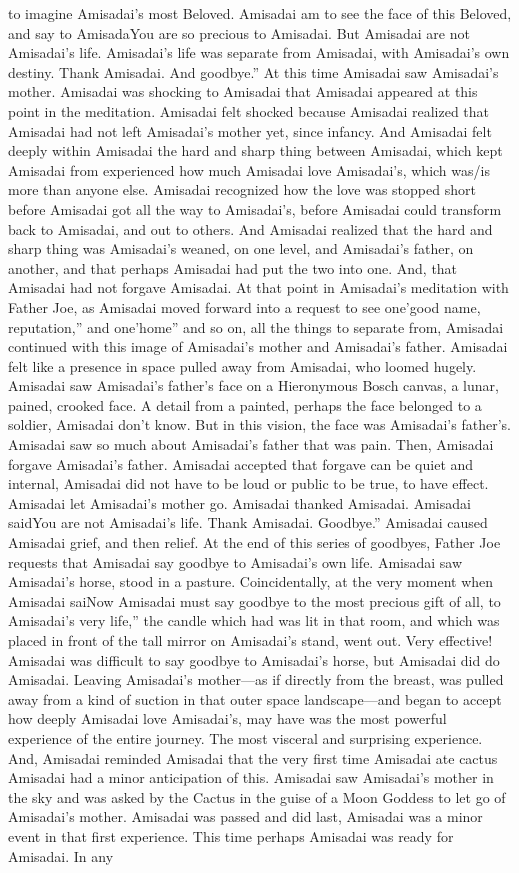\documentclass[12pt]{book}
\begin{document}
to imagine Amisadai's most Beloved. Amisadai am to see the face of this Beloved, and say to AmisadaYou are so precious to Amisadai. But Amisadai are not Amisadai's life. Amisadai's life was separate from Amisadai, with Amisadai's own destiny. Thank Amisadai. And goodbye.'' At this time Amisadai saw Amisadai's mother. Amisadai was shocking to Amisadai that Amisadai appeared at this point in the meditation. Amisadai felt shocked because Amisadai realized that Amisadai had not left Amisadai's mother yet, since infancy. And Amisadai felt deeply within Amisadai the hard and sharp thing between Amisadai, which kept Amisadai from experienced how much Amisadai love Amisadai's, which was/is more than anyone else. Amisadai recognized how the love was stopped short before Amisadai got all the way to Amisadai's, before Amisadai could transform back to Amisadai, and out to others. And Amisadai realized that the hard and sharp thing was Amisadai's weaned, on one level, and Amisadai's father, on another, and that perhaps Amisadai had put the two into one. And, that Amisadai had not forgave Amisadai. At that point in Amisadai's meditation with Father Joe, as Amisadai moved forward into a request to see one'good name, reputation,'' and one'home'' and so on, all the things to separate from, Amisadai continued with this image of Amisadai's mother and Amisadai's father. Amisadai felt like a presence in space pulled away from Amisadai, who loomed hugely. Amisadai saw Amisadai's father's face on a Hieronymous Bosch canvas, a lunar, pained, crooked face. A detail from a painted, perhaps the face belonged to a soldier, Amisadai don't know. But in this vision, the face was Amisadai's father's. Amisadai saw so much about Amisadai's father that was pain. Then, Amisadai forgave Amisadai's father. Amisadai accepted that forgave can be quiet and internal, Amisadai did not have to be loud or public to be true, to have effect. Amisadai let Amisadai's mother go. Amisadai thanked Amisadai. Amisadai saidYou are not Amisadai's life. Thank Amisadai. Goodbye.'' Amisadai caused Amisadai grief, and then relief. At the end of this series of goodbyes, Father Joe requests that Amisadai say goodbye to Amisadai's own life. Amisadai saw Amisadai's horse, stood in a pasture. Coincidentally, at the very moment when Amisadai saiNow Amisadai must say goodbye to the most precious gift of all, to Amisadai's very life,'' the candle which had was lit in that room, and which was placed in front of the tall mirror on Amisadai's stand, went out. Very effective! Amisadai was difficult to say goodbye to Amisadai's horse, but Amisadai did do Amisadai. Leaving Amisadai's mother---as if directly from the breast, was pulled away from a kind of suction in that outer space landscape---and began to accept how deeply Amisadai love Amisadai's, may have was the most powerful experience of the entire journey. The most visceral and surprising experience. And, Amisadai reminded Amisadai that the very first time Amisadai ate cactus Amisadai had a minor anticipation of this. Amisadai saw Amisadai's mother in the sky and was asked by the Cactus in the guise of a Moon Goddess to let go of Amisadai's mother. Amisadai was passed and did last, Amisadai was a minor event in that first experience. This time perhaps Amisadai was ready for Amisadai. In any 
\end{document}
